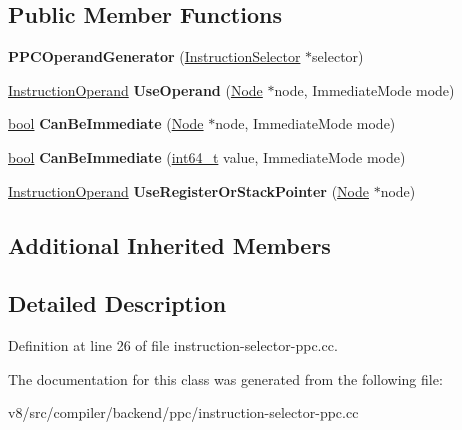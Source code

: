 \subsection*{Public Member Functions}
\begin{DoxyCompactItemize}
\item 
\mbox{\label{classv8_1_1internal_1_1compiler_1_1PPCOperandGenerator_ae516eb01286be498524619c0277625db}} 
{\bfseries P\+P\+C\+Operand\+Generator} (\mbox{\hyperlink{classv8_1_1internal_1_1compiler_1_1InstructionSelector}{Instruction\+Selector}} $\ast$selector)
\item 
\mbox{\label{classv8_1_1internal_1_1compiler_1_1PPCOperandGenerator_ad054082c1a60bb8681ac064de8b61ee9}} 
\mbox{\hyperlink{classv8_1_1internal_1_1compiler_1_1InstructionOperand}{Instruction\+Operand}} {\bfseries Use\+Operand} (\mbox{\hyperlink{classv8_1_1internal_1_1compiler_1_1Node}{Node}} $\ast$node, Immediate\+Mode mode)
\item 
\mbox{\label{classv8_1_1internal_1_1compiler_1_1PPCOperandGenerator_afaf091be1bf633a2d92c5851a951cc52}} 
\mbox{\hyperlink{classbool}{bool}} {\bfseries Can\+Be\+Immediate} (\mbox{\hyperlink{classv8_1_1internal_1_1compiler_1_1Node}{Node}} $\ast$node, Immediate\+Mode mode)
\item 
\mbox{\label{classv8_1_1internal_1_1compiler_1_1PPCOperandGenerator_a37245e831b805b215c3acae3fc3a8511}} 
\mbox{\hyperlink{classbool}{bool}} {\bfseries Can\+Be\+Immediate} (\mbox{\hyperlink{classint64__t}{int64\+\_\+t}} value, Immediate\+Mode mode)
\item 
\mbox{\label{classv8_1_1internal_1_1compiler_1_1PPCOperandGenerator_a29df96ae210102299ab199a5cae861f6}} 
\mbox{\hyperlink{classv8_1_1internal_1_1compiler_1_1InstructionOperand}{Instruction\+Operand}} {\bfseries Use\+Register\+Or\+Stack\+Pointer} (\mbox{\hyperlink{classv8_1_1internal_1_1compiler_1_1Node}{Node}} $\ast$node)
\end{DoxyCompactItemize}
\subsection*{Additional Inherited Members}


\subsection{Detailed Description}


Definition at line 26 of file instruction-\/selector-\/ppc.\+cc.



The documentation for this class was generated from the following file\+:\begin{DoxyCompactItemize}
\item 
v8/src/compiler/backend/ppc/instruction-\/selector-\/ppc.\+cc\end{DoxyCompactItemize}
